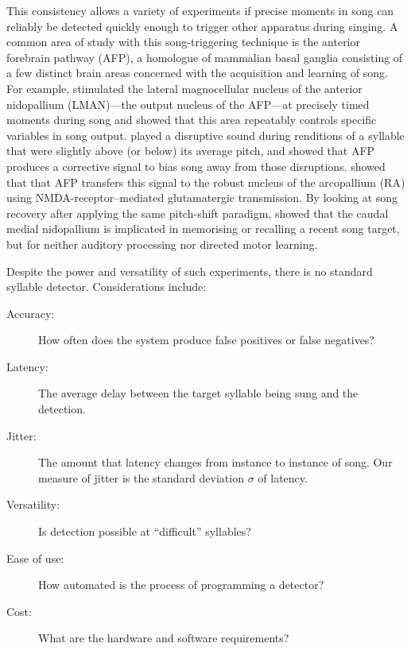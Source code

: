 \documentclass[10pt,letterpaper]{article}
\begin{document}
This consistency allows a variety of experiments if precise moments
in song can reliably be detected quickly enough to trigger other
apparatus during singing.  A common area of study with this song-triggering technique is the anterior forebrain pathway (AFP), a homologue of mammalian basal ganglia consisting of a few distinct brain areas concerned with the acquisition and learning of song.  For example, \cite{Kao2005} stimulated the
lateral magnocellular nucleus of the anterior nidopallium (LMAN)---the
output nucleus of the AFP---at precisely
timed moments during song and showed that this area repeatably
controls specific variables in song output.  \cite{Andalman2009} played a disruptive sound during renditions of a syllable that were slightly above (or below) its
average pitch, and showed
that AFP produces a corrective signal to bias song away from those disruptions.  \cite{Warren2011} showed
that that AFP transfers this signal to the robust nucleus of the arcopallium (RA) using NMDA-receptor--mediated glutamatergic
transmission. By looking at song recovery after applying the same
pitch-shift paradigm, \cite{Canopoli2014} showed that the caudal
medial nidopallium is implicated in memorising or recalling a recent
song target, but for neither auditory processing nor directed motor
learning.



Despite the power and versatility of such experiments, there is no standard syllable detector.  Considerations include:
\begin{description}
\item[Accuracy:] How often does the system produce false positives or false negatives?
\item[Latency:] The average delay between the target syllable being sung and the detection.
\item[Jitter:] The amount that latency changes from instance to instance of song.  Our measure of jitter is the standard deviation $\sigma$ of latency.
\item[Versatility:] Is detection possible at ``difficult'' syllables?
\item[Ease of use:] How automated is the process of programming a detector?
\item[Cost:] What are the hardware and software requirements?
\end{description}
\end{document}
